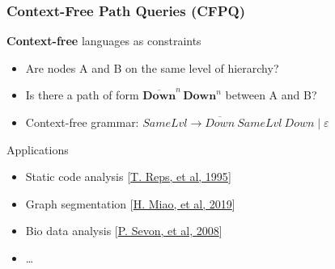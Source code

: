 \documentclass[xcolor=table,aspectratio=169]{beamer}
\begin{document}
\begin{frame}[fragile] \frametitle{Context-Free Path Queries (CFPQ)}
      \begin{minipage}[m]{0.45\linewidth}
  \end{minipage}\hfill
  \begin{minipage}[m]{0.5\linewidth}
  \textbf{Context-free} languages as constraints
  \begin{itemize}
        \item Are nodes A and B on the same level of hierarchy?
        \item Is there a path of form $\overline{\textbf{Down}}^n \, \textbf{Down}^n$ between A and B?
        \item Context-free grammar: $\textit{SameLvl} \to \overline{\textit{Down}} \ \textit{SameLvl} \ \textit{Down} \mid \varepsilon$
  \end{itemize}
  \pause

  \vspace{0.3cm}


  Applications
    \begin{itemize}
      \item Static code analysis [\href{https://dl.acm.org/doi/10.1145/199448.199462}{T. Reps, et al, 1995}]
      \item Graph segmentation [\href{https://dblp.org/rec/conf/icde/0001D19.html}{H. Miao, et al, 2019}]
      \item Bio data analysis [\href{https://pubmed.ncbi.nlm.nih.gov/20134073/}{P. Sevon, et al, 2008}]
      \item \ldots
    \end{itemize}

  \end{minipage}

  \end{frame}
\end{document}
